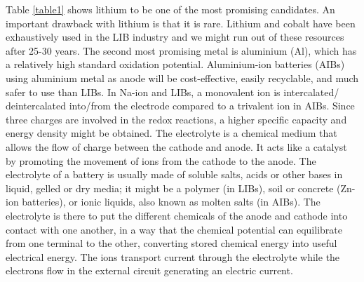 {Table \ref{table1} shows lithium to be one of the most promising candidates. An important drawback with lithium is that it is rare. Lithium and cobalt have been exhaustively used in the LIB industry and we might run out of these resources after 25-30 years. The second most promising metal is aluminium (Al), which has a relatively high standard oxidation potential. Aluminium-ion batteries (AIBs) using aluminium metal as anode will be cost-effective, easily recyclable, and much safer to use than LIBs.  In Na-ion and LIBs, a monovalent ion is intercalated/ deintercalated into/from the electrode compared to a trivalent ion in AIBs. Since three charges are involved in the redox reactions, a higher specific capacity and energy density might be obtained. The electrolyte is a chemical medium that allows the flow of charge between the cathode and anode. It acts like a catalyst by promoting the movement of ions from the cathode to the anode. The electrolyte of a battery is usually made of soluble salts, acids or other bases in liquid, gelled or dry media; it might be a polymer (in LIBs), soil or concrete (Zn-ion batteries), or ionic liquids, also known as molten salts (in AIBs). The electrolyte is there to put the different chemicals of the anode and cathode into contact with one another, in a way that the chemical potential can equilibrate from one terminal to the other, converting stored chemical energy into useful electrical energy. The ions transport current through the electrolyte while the electrons flow in the external circuit generating an electric current. 

}
